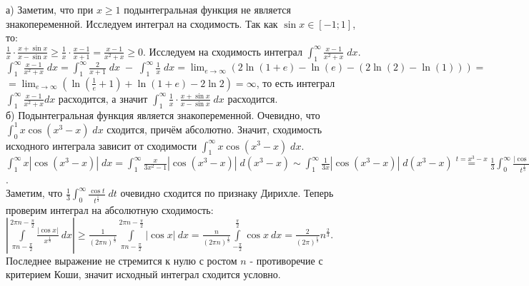\noindent а) Заметим, что при $x \geq 1$ подынтегральная функция не является знакопеременной. Исследуем интеграл на сходимость. Так как \(\sin{x} \in [-1; 1]\), то: \\
\(\displaystyle \frac{1}{x}\cdot\frac{x+\sin{x}}{x-\sin{x}} \geq \frac{1}{x}\cdot\frac{x-1}{x+1} = \frac{x-1}{x^2+x} \geq 0\). Исследуем на сходимость интеграл \(\displaystyle \int_1^{\infty} \frac{x-1}{x^2+x} \; dx\). \\
\(\displaystyle \int_1^{\infty} \frac{x-1}{x^2+x} \; dx = \int_{1}^{\infty} \frac{2}{x+1} \; dx \; - \; \int_{1}^{\infty} \frac{1}{x} \; dx = \lim_{e\rightarrow{\infty}}\left(2\ln(1+e)-\ln(e) - \left(2\ln(2) - \ln(1) \right) \right)= \) \\ 
\(=\displaystyle \lim_{e\rightarrow{\infty}}\left(\ln{\left(\frac{1}{e} + 1\right)} + \ln(1 + e)- 2\ln2  \right) = \infty\), то есть интеграл \(\displaystyle \int_1^{\infty} \frac{x-1}{x^2+x}dx\) расходится, а значит \(\displaystyle \int_1^{\infty}\frac{1}{x}\cdot\frac{x+\sin{x}}{x-\sin{x}} \; dx\) расходится. \\

\noindent б) Подынтегральная функция является знакопеременной. Очевидно, что \(\displaystyle \int_0^{1}x\cos{\left(x^3-x\right)} \; dx\) сходится, причём абсолютно. Значит, сходимость исходного интеграла зависит от сходимости \(\displaystyle \int_1^{\infty}x\cos{\left(x^3-x\right)} \; dx\). \\
\(\displaystyle \int_1^{\infty}x|\cos{\left(x^3-x\right)}| \; dx = \int_1^{\infty}\frac{x}{3x^2-1}|\cos{\left(x^3-x\right)}| \; d\left(x^3-x \right) \sim \int_1^{\infty}\frac{1}{3x}|\cos{\left(x^3-x\right)}| \; d\left(x^3-x \right) \stackrel{t = x^3-x}{=} \frac{1}{3}\int_0^{\infty}\frac{|\cos{t}|}{t^{\frac{1}{3}}} \; dt\). \\
Заметим, что \(\displaystyle \frac{1}{3}\int_0^{\infty}\frac{\cos{t}}{t^{\frac{1}{3}}} \; dt\) очевидно сходится по признаку Дирихле. Теперь проверим интеграл на абсолютную сходимость: \\
\(\displaystyle \left|\int\limits_{\pi n - \frac{\pi}{2}}^{2 \pi n - \frac{\pi}{2}} \frac{|\cos x|}{x^{\frac{1}{3}}} \ dx \right| \geq \frac{1}{(2\pi n)^{\frac{1}{3}}}\int\limits_{\pi n - \frac{\pi}{2}}^{2\pi n- \frac{\pi}{2}}|\cos x| \ dx = \frac{n}{(2\pi n)^{\frac{1}{3}}} \int\limits_{- \frac{\pi}{2}}^{\frac{\pi}{2}} \cos x \ dx = \frac{2}{(2\pi)^{\frac{1}{3}}}n^{\frac{2}{3}}\). Последнее выражение не стремится к нулю с ростом $n$ - противоречие с критерием Коши, значит исходный интеграл сходится условно. \\

